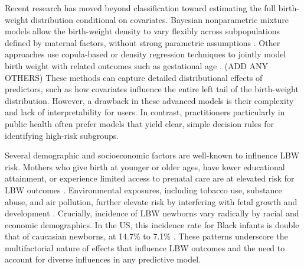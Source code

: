 
Recent research has moved beyond classification toward estimating the full birth-weight distribution conditional on covariates. Bayesian nonparametric mixture models allow the birth-weight density to vary flexibly across subpopulations defined by maternal factors, without strong parametric assumptions \citep{dunson2008}. Other approaches use copula-based or density regression techniques to jointly model birth weight with related outcomes such as gestational age \citep{rathjens2023}. (ADD ANY OTHERS) These methods can capture detailed distributional effects of predictors, such as how covariates influence the entire left tail of the birth-weight distribution. However, a drawback in these advanced models is their complexity and lack of interpretability for users. In contrast, practitioners particularly in public health often prefer models that yield clear, simple decision rules for identifying high-risk subgroups. 

Several demographic and socioeconomic factors are well-known to influence LBW risk. Mothers who give birth at younger or older ages, have lower educational attainment, or experience limited access to prenatal care are at elevated risk for LBW outcomes \citep{age_differences_lbw, finch2003, jain2024}. Environmental exposures, including tobacco use, substance abuse, and air pollution, further elevate risk by interfering with fetal growth and development \citep{standford_med_lbw, lu2020combined}. Crucially, incidence of LBW newborns vary radically by racial and economic demographics. In the US, this incidence rate for Black infants is double that of caucasian newborns, at 14.7\% to 7.1\%  \citep{marchofdimes2024}. These patterns underscore the multifactorial nature of effects that influence LBW outcomes and the need to account for diverse influences in any predictive model.

